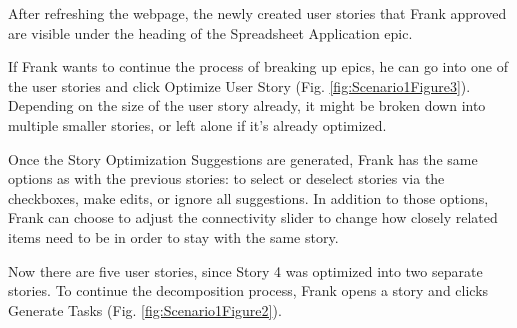 After refreshing the webpage, the newly created user stories that Frank approved are visible under the heading of the Spreadsheet Application epic.

If Frank wants to continue the process of breaking up epics, he can go into one of the user stories and click Optimize User Story (Fig. \ref{fig:Scenario1Figure3}). Depending on the size of the user story already, it might be broken down into multiple smaller stories, or left alone if it’s already optimized.

Once the Story Optimization Suggestions are generated, Frank has the same options as with the previous stories: to select or deselect stories via the checkboxes, make edits, or ignore all suggestions. In addition to those options, Frank can choose to adjust the connectivity slider to change how closely related items need to be in order to stay with the same story.  

Now there are five user stories, since Story 4 was optimized into two separate stories. To continue the decomposition process, Frank opens a story and clicks Generate Tasks (Fig. \ref{fig:Scenario1Figure2}).

